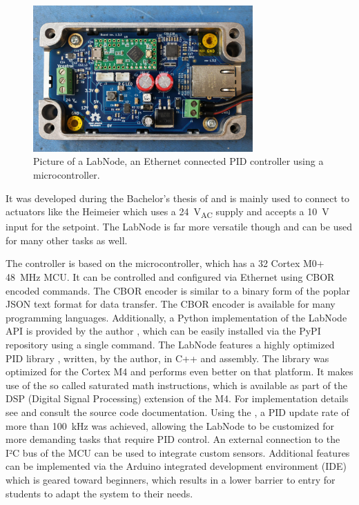 \begin{figure}[h]
    \centering
    \includegraphics[width=0.75\textwidth]{images/BM1A1831_labnode_lowres.JPG}
    \caption{Picture of a LabNode, an Ethernet connected PID controller using a  microcontroller.}
    \label{fig:labnode_picture}
\end{figure}

It was developed during the Bachelor’s thesis of \citeauthor{thesis_liebmann} \cite{thesis_liebmann} and is mainly used to connect to actuators like the Heimeier  \cite{datasheet_heimeier_emo_t} which uses a \qty{24}{\V_{AC}} supply and accepts a \qty{10}{\V} input for the setpoint. The LabNode is far more versatile though and can be used for many other tasks as well.

The controller is based on the  microcontroller, which has a \qty{32}{\bit} Cortex M0+ \qty{48}{\MHz} MCU. It can be controlled and configured via Ethernet using CBOR \cite{rfc_cbor} encoded commands. The CBOR encoder is similar to a binary form of the poplar JSON \cite{rfc_json} text format for data transfer. The CBOR encoder is available for many programming languages. Additionally, a Python implementation of the LabNode API is provided by the author \cite{git_labnode}, which can be easily installed via the PyPI repository using a single command. The LabNode features a highly optimized PID library \cite{git_pid}, written, by the author, in C++ and assembly. The library was optimized for the Cortex M4 and performs even better on that platform. It makes use of the so called saturated math instructions, which is available as part of the DSP (Digital Signal Processing) extension of the M4. For implementation details see \cite{git_pid} and consult the source code documentation. Using the , a PID update rate of more than \qty{100}{\kHz} was achieved, allowing the LabNode to be customized for more demanding tasks that require PID control. An external connection to the I²C bus of the MCU can be used to integrate custom sensors. Additional features can be implemented via the Arduino integrated development environment (IDE) which is geared toward beginners, which results in a lower barrier to entry for students to adapt the system to their needs.

